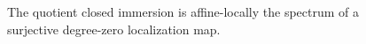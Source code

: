 \begin{figure}[ht]\centering
{}
\caption{The quotient closed immersion is affine-locally the spectrum of a surjective degree-zero localization map.}\label{fig:vi38-03}\end{figure}